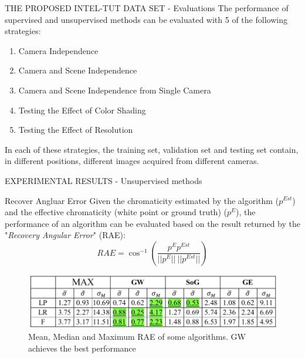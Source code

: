 \documentclass[10pt]{beamer}
\begin{document}
\begin{frame}{THE PROPOSED INTEL-TUT DATA SET - Evaluations}
    The performance of supervised and unsupervised methods can be 
    evaluated with 5 of the following strategies:
    \begin{enumerate}
        \item Camera Independence \label{CI}
        \item Camera and Scene Independence
        \item Camera and Scene Independence from Single Camera
        \item Testing the Effect of Color Shading
        \item Testing the Effect of Resolution
    \end{enumerate}
    In each of these strategies, the training set, validation set and testing 
    set contain, in different positions, different images acquired from different 
    cameras.
\end{frame}

\begin{frame}{EXPERIMENTAL RESULTS - Unsupervised methods}
    \begin{block}{Recover Angluar Error}
        Given the chromaticity estimated by the algorithm ($ p^{Est} $) and the 
        effective chromaticity (white point or ground truth) ($ p^E $), the 
        performance of an algorithm can be evaluated based on the result 
        returned by the "\emph{Recovery Angular Error}" (RAE):
        $$ RAE=\cos^{-1}\left(\frac{p^Ep^{Est}}{||p^E||~||p^{Est}||}\right) $$
    \end{block}
    \begin{figure}[htbp]
        \centering
        \includegraphics[width = 0.8 \linewidth]{images/paper4/standardHigh.png}
        \centering
        \caption{Mean, Median and Maximum RAE of some algorithms. GW  achieves the best performance}
        \label{fig:RAEstandard}
    \end{figure}
\end{frame}
\end{document}

